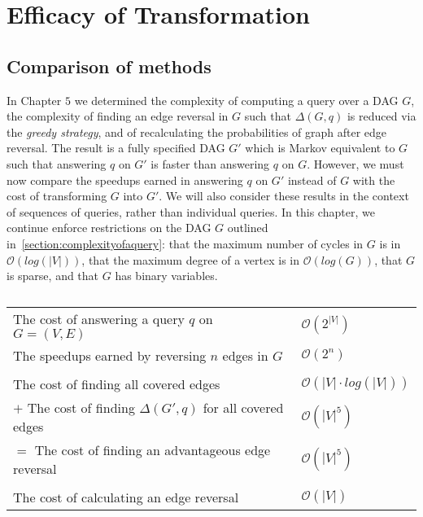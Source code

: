 \chapter{Efficacy of Transformation}

\section{Comparison of methods}
\null \quad \quad In Chapter $5$ we determined the complexity of computing a query over a DAG $G$, the complexity of finding an edge reversal in $G$ such that $\Delta(G,q)$ is reduced via the \textit{greedy strategy}, and of recalculating the probabilities of graph after edge reversal. The result is a fully specified DAG $G'$ which is Markov equivalent to $G$ such that answering $q$ on $G'$ is faster than answering $q$ on $G$. However, we must now compare the speedups earned in answering $q$ on $G'$ instead of $G$ with the cost of transforming $G$ into $G'$. We will also consider these results in the context of sequences of queries, rather than individual queries. \newline
\null \quad \quad In this chapter, we continue enforce restrictions on the DAG $G$ outlined in~\cref{section:complexityofaquery}: that the maximum number of cycles in $G$ is in $\mathcal{O}(log(|V|))$, that the maximum degree of a vertex is in $\mathcal{O}(log(G))$, that $G$ is sparse, and that $G$ has binary variables. \newline
\begin{table}[h!]
  \begin{center}
    \begin{tabular}{ l  l }
	\quad The cost of answering a query $q$ on $G=(V,E)$ 		& $\mathcal{O}(2^{|V|})$ \\[1em]
	\quad The speedups earned by reversing $n$ edges in $G$		& $\mathcal{O}(2^{n})$ \\[1em]
	\hline \\
	\quad  The cost of finding all covered edges 				& $\mathcal{O}(|V| \cdot log(|V|))$ \\[1em]
	$+$ The cost of finding $\Delta(G',q)$ for all covered edges 	& $\mathcal{O}(|V|^{5})$\\[1em]
	$=$ The cost of finding an advantageous edge reversal 		& $\mathcal{O}(|V|^{5})$ \\[1em]
	\hline \\
	\quad The cost of calculating an edge reversal					& $\mathcal{O}(|V|)$ 
    \end{tabular}
      \caption{}
      \label{tab:complexitytable}
  \end{center}
  \end{table}
